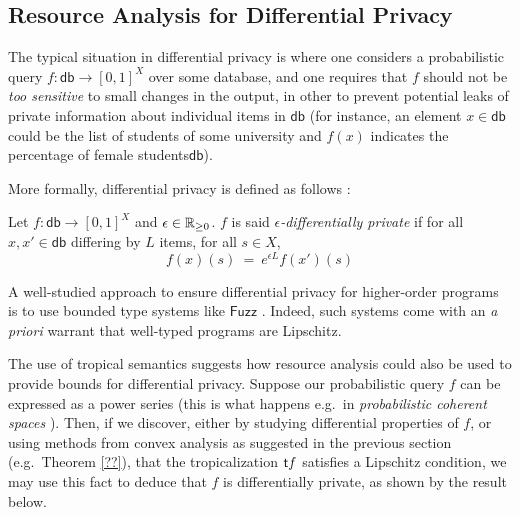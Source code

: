 \subsection{Resource Analysis for Differential Privacy}

The typical situation in differential privacy is where one considers a probabilistic query $f: \mathsf{db}\to [0,1]^{X}$ over some database, and one requires that $f$ should not be \emph{too sensitive} to small changes in the output, in other to prevent potential leaks of private information about individual items in $\mathsf{db}$ (for instance, an element $x\in\mathsf{db}$ could be the list of students of some university and $f(x)$ indicates the percentage of female students$\mathsf{db}$).

More formally, differential privacy is defined as follows \cite{}:
\begin{definition}
Let $f: \mathsf{db}\to [0,1]^{X}$ and $\epsilon \in \mathbb{R}_{\geq 0}$. $f$ is said \emph{$\epsilon$-differentially private} if for all $x,x'\in \mathsf{db}$
differing by $L$ items, for all $s\in X$, 
$$
f(x)(s) \ = \ e^{\epsilon L} f(x')(s)
$$
\end{definition}

A well-studied approach to ensure differential privacy for higher-order programs is to use bounded type systems like $\mathsf{Fuzz}$ \cite{}. Indeed, such systems come with an \emph{a priori} warrant that well-typed programs are Lipschitz.

The use of tropical semantics suggests how resource analysis could also be used to provide bounds for differential privacy. 
Suppose our probabilistic query $f$ can be expressed as a power series (this is what happens e.g.~in \emph{probabilistic coherent spaces} \cite{}). Then, if we discover, either by studying differential properties of $f$, or using methods from convex analysis as suggested in the previous section (e.g.~Theorem \ref{??}), 
 that the tropicalization $\mathsf{t} f$ satisfies a Lipschitz condition, we may use this fact to deduce that $f$ is differentially private, as shown by the result below.

